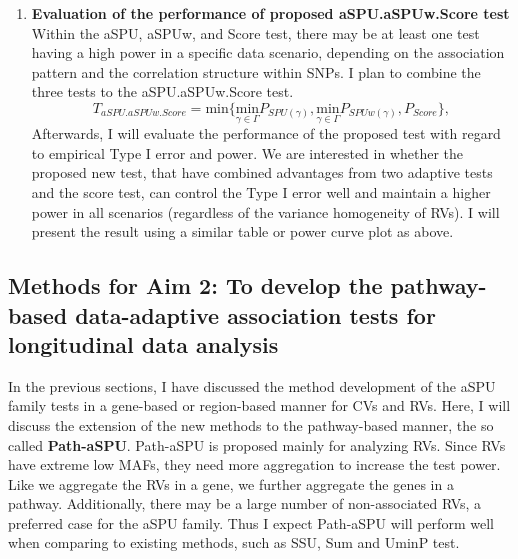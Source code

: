 \documentclass[12pt]{article}
\begin{document}
\begin{enumerate}
\item \textbf{Evaluation of the performance of proposed aSPU.aSPUw.Score test}\\
Within the aSPU, aSPUw, and Score test, there may be at least one test having a high power in a specific data scenario, depending on the association pattern and the correlation structure within SNPs. I plan to combine the three tests to the aSPU.aSPUw.Score test. 
$$
T_{aSPU.aSPUw.Score} = \textrm{min} \Big\{ \underset{\gamma\in\Gamma}{ \textrm{min} } P_{ SPU(\gamma) },\underset{\gamma\in\Gamma}{ \textrm{min} } P_{ SPUw(\gamma) }, P_{Score} \Big\},
$$ 
Afterwards, I will evaluate the performance of the proposed test with regard to empirical Type I error and power. We are interested in whether the proposed new test, that have combined advantages from two adaptive tests and the score test, can control the Type I error well and maintain a higher power in all scenarios (regardless of the variance homogeneity of RVs). I will present the result using a similar table or power curve plot as above. 
\end{enumerate}

\subsection{Methods for Aim 2: To develop the pathway-based data-adaptive association tests for longitudinal data analysis}
\label{sec:aim2}
In the previous sections, I have discussed the method development of the aSPU family tests in a gene-based or region-based manner for CVs and RVs. Here, I will discuss the extension of the new methods to the pathway-based manner, the so called \textbf{Path-aSPU}. Path-aSPU is proposed mainly for analyzing RVs. Since RVs have extreme low MAFs, they need more aggregation to increase the test power. Like we aggregate the RVs in a gene, we further aggregate the genes in a pathway. Additionally, there may be a large number of non-associated RVs, a preferred case for the aSPU family. Thus I expect Path-aSPU will perform well when comparing to existing methods, such as SSU, Sum and UminP test. 
\end{document}
